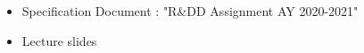 \begin{itemize}
    \item Specification Document : "R\&DD Assignment AY 2020-2021"
    \item Lecture slides
\end{itemize}